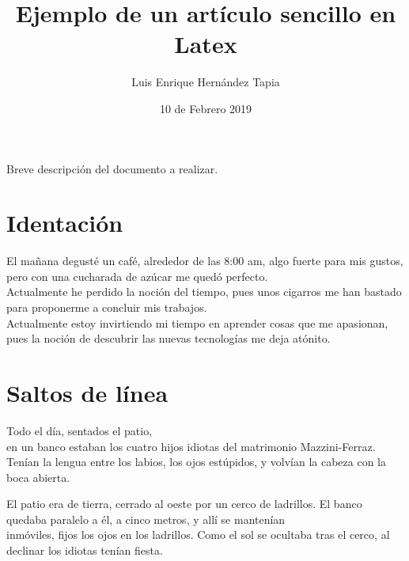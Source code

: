 \documentclass[12pt,latterpaper]{article}
\title{Ejemplo de un artículo sencillo en Latex}
\author{Luis Enrique Hernández Tapia}
\date{10 de Febrero 2019}
\begin{document}
\maketitle %

Breve descripción del documento a realizar.

\section{Identación}

\noindent El mañana degusté un café, alrededor de las 8:00 am, algo fuerte para mis gustos, pero con una cucharada de azúcar me quedó perfecto.\\

Actualmente he perdido la noción del tiempo, pues unos cigarros me han bastado para proponerme a concluir mis trabajos.\\

\noindent Actualmente estoy invirtiendo mi tiempo en aprender cosas que me apasionan, pues la noción de descubrir las nuevas tecnologías me deja atónito.


\section{Saltos de línea}

Todo el día, sentados el patio,\\ en un banco estaban los cuatro hijos
idiotas del matrimonio Mazzini-Ferraz. \newline Tenían la lengua
entre los labios, los ojos estúpidos, y volvían la cabeza con la boca
abierta.

\newpage

\par El patio era de tierra, cerrado al oeste por un cerco de ladrillos.
El banco quedaba paralelo a él, a cinco metros, y allí se mantenían
\\[.5cm]
inmóviles, fijos los ojos en los ladrillos.
Como el sol se ocultaba tras el cerco, al declinar los idiotas tenían
fiesta.
\end{document}
